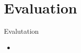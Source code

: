 \section{Evaluation}
\begin{frame}{Evalutation}
	\begin{itemize}
		\item 
	\end{itemize}
\end{frame}